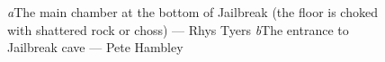 	\begin{figure}[t!]
	\checkoddpage \ifoddpage \forcerectofloat \else \forceversofloat \fi
		\centering
		\begin{subfigure}[t]{0.517\textwidth}
			\centering
			\caption{}
			\label{Inside Jailbreak}
		\end{subfigure}
	\hfill
		\begin{subfigure}[t]{0.463\textwidth}
			\centering
			\caption{}\label{Entrance to Jailbreak}
		\end{subfigure}
		\caption{ \emph{a}The main chamber at the bottom of Jailbreak (the floor is choked with shattered rock or choss) --- Rhys Tyers \emph{b}The entrance to Jailbreak cave --- Pete Hambley}
	\end{figure}


